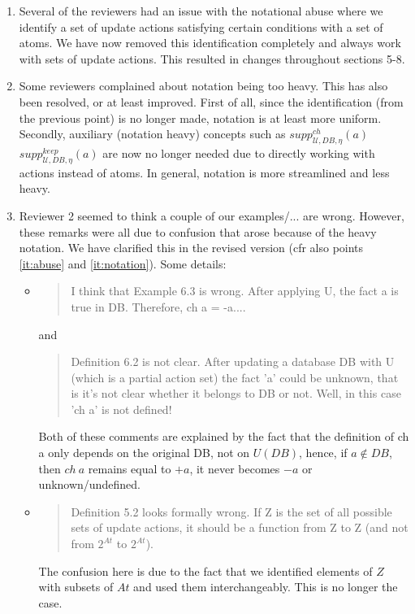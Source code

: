 \documentclass{article}
\begin{document}
\begin{enumerate}
	  \item \label{it:abuse}Several of the reviewers had an issue with the notational abuse where we identify a set of update actions satisfying certain conditions with a set of atoms. We have now removed this identification completely and always work with sets of update actions.  This resulted in changes throughout sections 5-8.
	  \item \label{it:notation} Some reviewers complained about notation being too heavy. This has also been resolved, or at least improved. First of all, since the identification (from the previous point) is no longer made, notation is at least more uniform. Secondly, auxiliary (notation heavy) concepts such as $\mathit{supp}_{\mathcal{U},\mathit{DB},\eta}^{ch}(a)$ $\mathit{supp}_{\mathcal{U},\mathit{DB},\eta}^{keep}(a)$ are now no longer needed due to directly working with actions instead of atoms. In general, notation is more streamlined and less heavy. 
	  \item Reviewer 2 seemed to think a couple of our examples/... are wrong. However, these remarks were all due to confusion that arose because of the heavy notation. 
	  We have clarified this in the revised version (cfr also points \ref{it:abuse} and \ref{it:notation}). Some details: 
	  \begin{itemize}
	  \item \begin{quote}I think that Example 6.3 is wrong. After applying U, the fact a is true in DB.
Therefore, ch a = -a.... \end{quote} and 
\begin{quote}
 Definition 6.2 is not clear. After updating a database DB with U (which is a partial action set) the
fact 'a' could be unknown, that is it's not clear whether it belongs to DB or not.
Well, in this case 'ch a' is not defined!
\end{quote}
Both of these comments are explained by the fact that the definition of ch a only depends on the original DB, not on $U(DB)$, hence, if $a\not\in DB$, then  $ch\ a$ remains equal to $+a$, it never becomes $-a$ or unknown/undefined. 
	  \item \begin{quote}
	         Definition 5.2 looks formally wrong. If Z is the set of all possible sets of update actions, it should be a function from Z to Z (and not from $2^{At}$ to $2^{At}$).
	        \end{quote}
	         The confusion here is due to the fact that we identified elements of $Z$  with subsets of $At$ and used them interchangeably. This is no longer the case.
	      

\end{itemize}
\end{enumerate}
\end{document}

